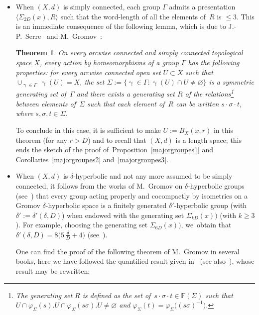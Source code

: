\documentclass[10pt,a4paper]{amsart}
\numberwithin{equation}{section}
\newtheorem{theor}{Theorem}[section]
\newcommand{\g}{\operatorname{\gamma}}
\begin{document}
\begin{itemize}\itemsep=0pt
\item When $(X,d)$ is simply connected, each group $\Gamma$ admits a presentation $\langle \Sigma_{2 D} (x), R \rangle$
such that the word-length of all the elements of~$R$ is $\le 3$. This is an immediate consequence of the following lemma, which is due to J.-P.~Serre~\cite[p.~30]{Se} and M.~Gromov~\cite{Gr1}:

\begin{theor}%
On every arcwise connected and simply connected topological space $X$, every action by
homeomorphisms of a group $\Gamma$ has the following properties: for every arcwise connected open set $U \subset X$ such that
$ \cup_{\g \in \Gamma} \, \g (U) = X$, the set $\Sigma := \{ \g \in \Gamma \colon \g(U) \cap U \ne \varnothing\} $ is a symmetric generating set of~$\Gamma$ and
there exists a generating set
$R$ of the relations\footnote{The generating set $R$ is defined as the set of~$ s\cdot \sigma \cdot t \in \mathbb F (\Sigma)$ such that $U \cap \varphi_\Sigma (s).U \cap \varphi_\Sigma (s \sigma).U \ne \varnothing$ and $ \varphi_\Sigma (t) = \varphi_\Sigma \big( (s \sigma)^{-1}\big)$.} between elements of~$\Sigma$ such that each element of~$R$ can
be written $ s\cdot \sigma \cdot t$, where $s,\sigma, t \in \Sigma$.
\end{theor}
To conclude in this case, it is sufficient to make $U := B_X (x, r)$ in
this theorem (for any $r > D$) and to recall that $(X,d)$ is a length space; this ends the sketch of the proof of~Proposition~\ref{majorgroupes1} and Corollaries~\ref{majorgroupes2} and~\ref{majorgroupes3}.

\item When $(X,d)$ is $\delta$-hyperbolic and not any more assumed to be simply connected, it follows from the works of M.~Gromov on $\delta$-hyperbolic groups
(see~\cite[Theorems~3.22 and~5.12, p.~88]{GH}) that every group acting properly and cocompactly by isometries on a
Gromov $\delta$-hyperbolic space is a finitely generated $\delta'$-hyperbolic group (with $\delta' := \delta' (\delta, D)$) when endowed with the generating set $\Sigma_{k D} (x))$ (with $k \ge 3$). For example, choosing the gene\-ra\-ting set $ \Sigma_{6 D} (x))$, we~obtain that $\delta' (\delta, D)
= 8 \big( 5\,\frac{\delta}{D} + 4\big)$ (see~\cite{BCGS2}).

One can find the proof of the following theorem of M.~Gromov in several books, here we have followed the quantified result given in~\cite[Chapitre~5, proof of
Theorem~2.3]{CDP} (see also~\cite[Chapitre~4, Proposition~17]{GH}), whose result may be rewritten:


\end{itemize}
\end{document}
